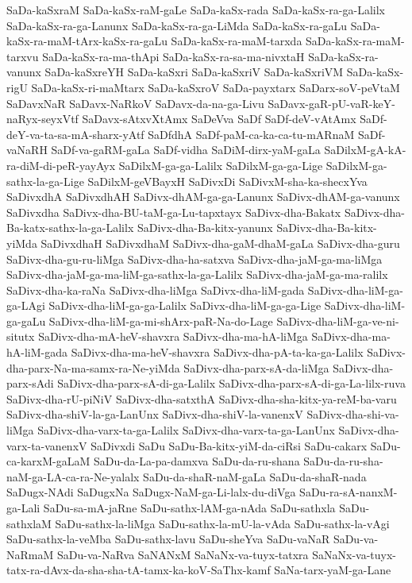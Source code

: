 {SaDa-kaSxraM
SaDa-kaSx-raM-gaLe
SaDa-kaSx-rada
SaDa-kaSx-ra-ga-Lalilx
SaDa-kaSx-ra-ga-Lanunx
SaDa-kaSx-ra-ga-LiMda
SaDa-kaSx-ra-gaLu
SaDa-kaSx-ra-maM-tArx-kaSx-ra-gaLu
SaDa-kaSx-ra-maM-tarxda
SaDa-kaSx-ra-maM-tarxvu
SaDa-kaSx-ra-ma-thApi
SaDa-kaSx-ra-sa-ma-nivxtaH
SaDa-kaSx-ra-vanunx
SaDa-kaSxreYH
SaDa-kaSxri
SaDa-kaSxriV
SaDa-kaSxriVM
SaDa-kaSx-rigU
SaDa-kaSx-ri-maMtarx
SaDa-kaSxroV
SaDa-payxtarx
SaDarx-soV-peVtaM
SaDavxNaR
SaDavx-NaRkoV
SaDavx-da-na-ga-Livu
SaDavx-gaR-pU-vaR-keY-naRyx-seyxVtf
SaDavx-sAtxvXtAmx
SaDeVva
SaDf
SaDf-deV-vAtAmx
SaDf-deY-va-ta-sa-mA-sharx-yAtf
SaDfdhA
SaDf-paM-ca-ka-ca-tu-mARnaM
SaDf-vaNaRH
SaDf-va-gaRM-gaLa
SaDf-vidha
SaDiM-dirx-yaM-gaLa
SaDilxM-gA-kA-ra-diM-di-peR-yayAyx
SaDilxM-ga-ga-Lalilx
SaDilxM-ga-ga-Lige
SaDilxM-ga-sathx-la-ga-Lige
SaDilxM-geVBayxH
SaDivxDi
SaDivxM-sha-ka-shecxYva
SaDivxdhA
SaDivxdhAH
SaDivx-dhAM-ga-ga-Lanunx
SaDivx-dhAM-ga-vanunx
SaDivxdha
SaDivx-dha-BU-taM-ga-Lu-tapxtayx
SaDivx-dha-Bakatx
SaDivx-dha-Ba-katx-sathx-la-ga-Lalilx
SaDivx-dha-Ba-kitx-yanunx
SaDivx-dha-Ba-kitx-yiMda
SaDivxdhaH
SaDivxdhaM
SaDivx-dha-gaM-dhaM-gaLa
SaDivx-dha-guru
SaDivx-dha-gu-ru-liMga
SaDivx-dha-ha-satxva
SaDivx-dha-jaM-ga-ma-liMga
SaDivx-dha-jaM-ga-ma-liM-ga-sathx-la-ga-Lalilx
SaDivx-dha-jaM-ga-ma-ralilx
SaDivx-dha-ka-raNa
SaDivx-dha-liMga
SaDivx-dha-liM-gada
SaDivx-dha-liM-ga-ga-LAgi
SaDivx-dha-liM-ga-ga-Lalilx
SaDivx-dha-liM-ga-ga-Lige
SaDivx-dha-liM-ga-gaLu
SaDivx-dha-liM-ga-mi-shArx-paR-Na-do-Lage
SaDivx-dha-liM-ga-ve-ni-situtx
SaDivx-dha-mA-heV-shavxra
SaDivx-dha-ma-hA-liMga
SaDivx-dha-ma-hA-liM-gada
SaDivx-dha-ma-heV-shavxra
SaDivx-dha-pA-ta-ka-ga-Lalilx
SaDivx-dha-parx-Na-ma-samx-ra-Ne-yiMda
SaDivx-dha-parx-sA-da-liMga
SaDivx-dha-parx-sAdi
SaDivx-dha-parx-sA-di-ga-Lalilx
SaDivx-dha-parx-sA-di-ga-La-lilx-ruva
SaDivx-dha-rU-piNiV
SaDivx-dha-satxthA
SaDivx-dha-sha-kitx-ya-reM-ba-varu
SaDivx-dha-shiV-la-ga-LanUnx
SaDivx-dha-shiV-la-vanenxV
SaDivx-dha-shi-va-liMga
SaDivx-dha-varx-ta-ga-Lalilx
SaDivx-dha-varx-ta-ga-LanUnx
SaDivx-dha-varx-ta-vanenxV
SaDivxdi
SaDu
SaDu-Ba-kitx-yiM-da-ciRsi
SaDu-cakarx
SaDu-ca-karxM-gaLaM
SaDu-da-La-pa-damxva
SaDu-da-ru-shana
SaDu-da-ru-sha-naM-ga-LA-ca-ra-Ne-yalalx
SaDu-da-shaR-naM-gaLa
SaDu-da-shaR-nada
SaDugx-NAdi
SaDugxNa
SaDugx-NaM-ga-Li-lalx-du-diVga
SaDu-ra-sA-nanxM-ga-Lali
SaDu-sa-mA-jaRne
SaDu-sathx-lAM-ga-nAda
SaDu-sathxla
SaDu-sathxlaM
SaDu-sathx-la-liMga
SaDu-sathx-la-mU-la-vAda
SaDu-sathx-la-vAgi
SaDu-sathx-la-veMba
SaDu-sathx-lavu
SaDu-sheYva
SaDu-vaNaR
SaDu-va-NaRmaM
SaDu-va-NaRva
SaNANxM
SaNaNx-va-tuyx-tatxra
SaNaNx-va-tuyx-tatx-ra-dAvx-da-sha-sha-tA-tamx-ka-koV-SaThx-kamf
SaNa-tarx-yaM-ga-Lane
}
